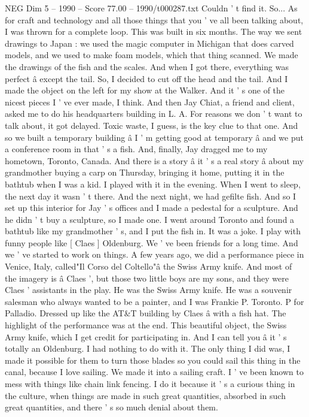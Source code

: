 \begin{textsample}{NEG Dim 5 – 1990 – Score 77.00 – 1990/t000287.txt}
Couldn ' t find it.
So...
As for craft and technology and all those things that you ' ve all been talking about, I was thrown for a complete loop.
This was built in six months.
The way we sent drawings to Japan : we used the magic computer in Michigan that does carved models, and we used to make foam models, which that thing scanned.
We made the drawings of the fish and the scales.
And when I got there, everything was perfect â except the tail.
So, I decided to cut off the head and the tail.
And I made the object on the left for my show at the Walker.
And it ' s one of the nicest pieces I ' ve ever made, I think.
And then Jay Chiat, a friend and client, asked me to do his headquarters building in L.
A.
For reasons we don ' t want to talk about, it got delayed.
Toxic waste, I guess, is the key clue to that one.
And so we built a temporary building â I ' m getting good at temporary â and we put a conference room in that ' s a fish.
And, finally, Jay dragged me to my hometown, Toronto, Canada.
And there is a story â it ' s a real story â about my grandmother buying a carp on Thursday, bringing it home, putting it in the bathtub when I was a kid.
I played with it in the evening.
When I went to sleep, the next day it wasn ' t there.
And the next night, we had gefilte fish.
And so I set up this interior for Jay ' s offices and I made a pedestal for a sculpture.
And he didn ' t buy a sculpture, so I made one.
I went around Toronto and found a bathtub like my grandmother ' s, and I put the fish in.
It was a joke.
I play with funny people like [ Claes ] Oldenburg.
We ' ve been friends for a long time.
And we ' ve started to work on things.
A few years ago, we did a performance piece in Venice, Italy, called"Il Corso del Coltello"â the Swiss Army knife.
And most of the imagery is â Claes ', but those two little boys are my sons, and they were Claes ' assistants in the play.
He was the Swiss Army knife.
He was a souvenir salesman who always wanted to be a painter, and I was Frankie P.
Toronto.
P for Palladio.
Dressed up like the AT\&T building by Claes â with a fish hat.
The highlight of the performance was at the end.
This beautiful object, the Swiss Army knife, which I get credit for participating in.
And I can tell you â it ' s totally an Oldenburg.
I had nothing to do with it.
The only thing I did was, I made it possible for them to turn those blades so you could sail this thing in the canal, because I love sailing.
We made it into a sailing craft.
I ' ve been known to mess with things like chain link fencing.
I do it because it ' s a curious thing in the culture, when things are made in such great quantities, absorbed in such great quantities, and there ' s so much denial about them.

\end{textsample}

